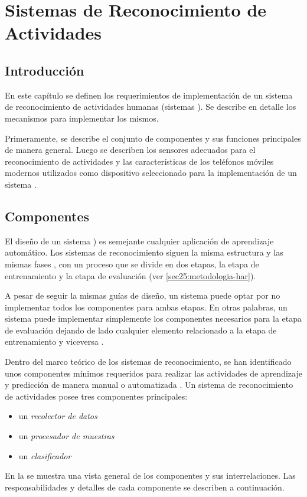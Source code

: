 
\chapter{Sistemas de Reconocimiento de Actividades }

\label{chap4:sistemas-de-reconocimiento}

\section{Introducción}

\label{sec41:introduccion}

En este capítulo se definen los requerimientos de implementación de
un sistema de reconocimiento de actividades humanas (sistemas ).
Se describe en detalle los mecanismos para implementar los mismos. 

Primeramente, se describe el conjunto de componentes y sus funciones
principales de manera general. Luego se describen los sensores adecuados
para el reconocimiento de actividades y las características de los
teléfonos móviles modernos utilizados como dispositivo seleccionado
para la implementación de un sistema .

\section{Componentes}

El diseño de un sistema ) es semejante cualquier aplicación
de aprendizaje automático. Los sistemas de reconocimiento siguen la
misma estructura y las mismas fases \cite{LaraLabrador2013}, con
un proceso que se divide en dos etapas, la etapa de entrenamiento
y la etapa de evaluación (ver \ref{sec25:metodologia-har}). 

A pesar de seguir la mismas guías de diseño, un sistema puede optar
por no implementar todos los componentes para ambas etapas. En otras
palabras, un sistema puede implementar simplemente los componentes
necesarios para la etapa de evaluación dejando de lado cualquier elemento
relacionado a la etapa de entrenamiento y viceversa . 

Dentro del marco teórico de los sistemas de reconocimiento, se han
identificado unos componentes mínimos requeridos para realizar las
actividades de aprendizaje y predicción de manera manual o automatizada
\cite{Choudhury2008}. Un sistema de reconocimiento de actividades
posee tres componentes principales:
\begin{itemize}
\item un \emph{recolector de datos}
\item un\emph{ procesador de muestras} 
\item un \emph{clasificador }
\end{itemize}
En la  se muestra una vista general
de los componentes y sus interrelaciones. Las responsabilidades y
detalles de cada componente se describen a continuación. 


